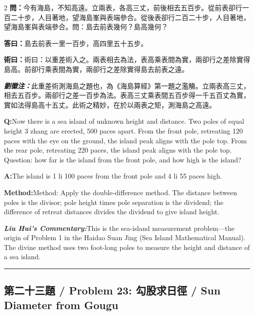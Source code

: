 \documentclass[11pt,a4paper]{article}
\newcommand{\cnwen}{\textcolor{cnlabelfg}{\textbf{問：}}}
\newcommand{\cnda}{\textbf{答曰：}}
\newcommand{\cnshu}{\textcolor{cnlabelfg}{\textbf{術曰：}}}
\newcommand{\cnzhu}{\textcolor{commentarycolor}{\textit{\textbf{劉徽注：}}}}
\newcommand{\enwen}{\textcolor{enlabelfg}{\textbf{Q:}}}
\newcommand{\enda}{\textcolor{enlabelfg}{\textbf{A:}}}
\newcommand{\enshu}{\textcolor{enlabelfg}{\textbf{Method:}}}
\newcommand{\enzhu}{\textcolor{enlabelfg}{\textit{\textbf{Liu Hui's Commentary:}}}}
\begin{document}
\begin{paracol}{2}
\switchcolumn[0]
\cnwen 今有海島，不知高遠。立兩表，各高三丈，前後相去五百步。從前表卻行一百二十步，人目著地，望海島峯與表端參合。從後表卻行二百二十步，人目著地，望海島峯與表端參合。問：島去前表幾何？島高幾何？

\cnda 島去前表一里一百步，高四里五十五步。

\cnshu 術曰：以重差術入之。兩表相去為法，表高乘表間為實，兩卻行之差除實得島高。前卻行乘表間為實，兩卻行之差除實得島去前表之遠。

\cnzhu 此重差術測海島之題也，為《海島算經》第一題之濫觴。立兩表高三丈，相去五百步。兩卻行之差一百步為法。表高三丈乘表間五百步得一千五百丈為實，實如法得島高十五丈。此術之精妙，在於以兩表之矩，測海島之高遠。

\switchcolumn[1]
\enwen Now there is a sea island of unknown height and distance. Two poles of equal height 3 zhang are erected, 500 paces apart. From the front pole, retreating 120 paces with the eye on the ground, the island peak aligns with the pole top. From the rear pole, retreating 220 paces, the island peak aligns with the pole top. Question: how far is the island from the front pole, and how high is the island?

\enda The island is 1 li 100 paces from the front pole and 4 li 55 paces high.

\enshu Method: Apply the double-difference method. The distance between poles is the divisor; pole height times pole separation is the dividend; the difference of retreat distances divides the dividend to give island height.

\enzhu This is the sea-island measurement problem---the origin of Problem 1 in the Haidao Suan Jing (Sea Island Mathematical Manual). The divine method uses two foot-long poles to measure the height and distance of a sea island.
\end{paracol}

\bigskip\hrule\bigskip

\subsection{第二十三題 / Problem 23: 勾股求日徑 / Sun Diameter from Gougu}
\end{document}
